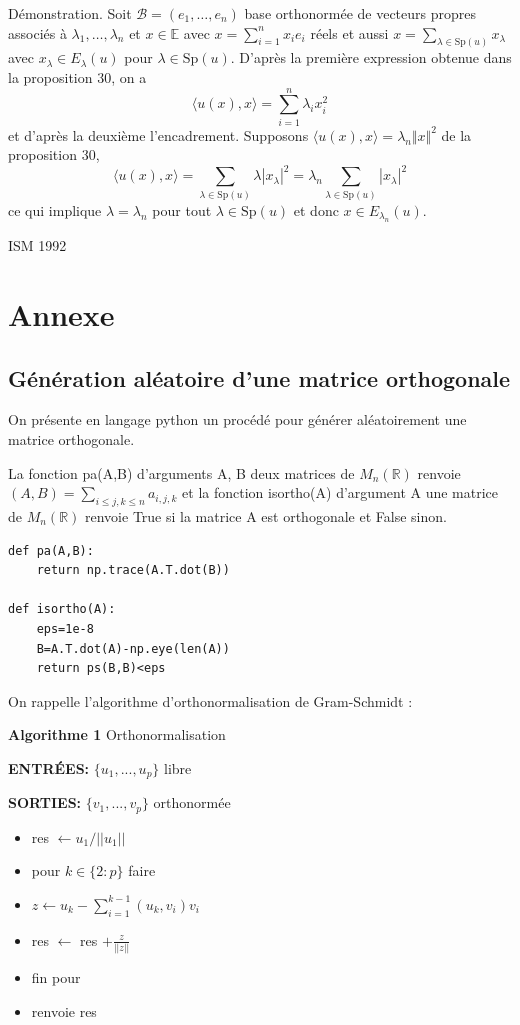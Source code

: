 Démonstration. Soit $\mathcal{B} = (e_1, \dots, e_n)$ base orthonormée de vecteurs propres associés à $\lambda_1, \dots, \lambda_n$ et $x \in \mathbb{E}$ avec $x = \sum_{i=1}^n x_i e_i$ réels et aussi $x = \sum_{\lambda \in \text{Sp}(u)} x_\lambda$ avec $x_\lambda \in E_\lambda(u)$ pour $\lambda \in \text{Sp}(u)$. D'après la première expression obtenue dans la proposition 30, on a
\[
\langle u(x), x \rangle = \sum_{i=1}^n \lambda_i x_i^2
\]
et d'après la deuxième l'encadrement. Supposons $\langle u(x), x \rangle = \lambda_n \Vert x \Vert^2$ de la proposition 30,
\[
\langle u(x), x \rangle = \sum_{\lambda \in \text{Sp}(u)} \lambda |x_\lambda|^2 = \lambda_n \sum_{\lambda \in \text{Sp}(u)} |x_\lambda|^2
\]
ce qui implique $\lambda = \lambda_n$ pour tout $\lambda \in \text{Sp}(u)$ et donc $x \in E_{\lambda_n}(u)$.

ISM 1992


\section*{Annexe}

\subsection*{Génération aléatoire d'une matrice orthogonale}

On présente en langage python un procédé pour générer aléatoirement une matrice orthogonale.

La fonction pa(A,B) d'arguments A, B deux matrices de $M_n(\mathbb{R})$ renvoie $(A, B) = \sum_{i \leq j, k \leq n} a_{i,j,k}$
et la fonction isortho(A) d'argument A une matrice de $M_n(\mathbb{R})$ renvoie True si la matrice A est orthogonale et False sinon.

\begin{verbatim}
def pa(A,B):
    return np.trace(A.T.dot(B))

def isortho(A):
    eps=1e-8
    B=A.T.dot(A)-np.eye(len(A))
    return ps(B,B)<eps
\end{verbatim}

On rappelle l'algorithme d'orthonormalisation de Gram-Schmidt :

\textbf{Algorithme 1} Orthonormalisation

\textbf{ENTRÉES:} $\{u_1, ..., u_p\}$ libre

\textbf{SORTIES:} $\{v_1, ..., v_p\}$ orthonormée

\begin{itemize}
    \item res $\leftarrow u_1/||u_1||$
    \item pour $k \in \{2: p\}$ faire
    \item \quad $z \leftarrow u_k - \sum_{i=1}^{k-1} (u_k, v_i) v_i$
    \item \quad res $\leftarrow$ res $+ \frac{z}{||z||}$
    \item fin pour
    \item renvoie res
\end{itemize}

